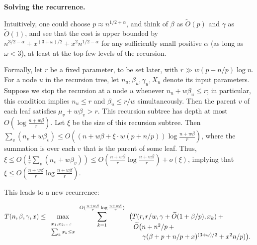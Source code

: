 \documentclass[10pt,a4paper]{article}
\begin{document}
\par
\par\medskip\noindent\textbf{Solving the recurrence.}\par
Intuitively, one could choose $p\approx n^{1/2+\alpha}$, and think of $\beta$ as $\widetilde{O}(p)$ and $\gamma$ as $\widetilde{O}(1)$, and see that the cost is upper bounded by $n^{3/2-\alpha}+x^{(3+\omega)/2}+x^{2}n^{1/2-\alpha}$ for any sufficiently small positive $\alpha$ (as long as $\omega<3$), at least at the top few levels of the recursion.
\par
\par
Formally, let $r$ be a fixed parameter, to be set later, with $r\gg w(p+n/p)\log n$. For a node $u$ in the recursion tree, let $n_{u},\beta_{u},\gamma_{u},X_{u}$ denote its input parameters. Suppose we stop the recursion at a node $u$ whenever $n_{u}+w\beta_{u}\leq r$; in particular, this condition implies $n_{u}\leq r$ and $\beta_{u}\leq r/w$ simultaneously. Then the parent $v$ of each leaf satisfies $\mu_{v}+w\beta_{v}>r$. This recursion subtree has depth at most $O(\log\frac{n+w\beta}{r})$. Let $\xi$ be the size of this recursion subtree. Then $\sum_{v}(n_{v}+w\beta_{v})\leq O((n+w\beta+\xi\cdot w(p+n/p))\log\frac{n+w%
\beta}{r})$, where the summation is over each $v$ that is the parent of some leaf. Thus, $\xi\leq O(\frac{1}{r}\sum_{v}(n_{v}+w\beta_{v}))\leq O(\frac{n+w\beta}{r}\log%
\frac{n+w\beta}{r})+o(\xi)$, implying that $\xi\leq O(\frac{n+w\beta}{r}\log\frac{n+w\beta}{r})$.
\par
\par
This leads to a new recurrence:
\par
\[\begin{aligned}
T(n,\beta,\gamma,x)\leq\max_{\begin{array}[]{l}\scriptstyle{x_{1},x_{2},\ldots%
:}\\
\scriptstyle{\sum_{k}x_{k}\leq x}\end{array}}\sum_{k=1}^{O(\frac{n+w\beta}{r}%
\log\frac{n+w\beta}{r})}\begin{array}[t]{l}\big(T(r,r/w,\gamma+\widetilde{O}(1%
+\beta/p),x_{k})+{}\\[2.15277pt]
\ \ \widetilde{O}\big(n+n^{2}/p+{}\\[2.15277pt]
\ \ \ \ \ \ \gamma(\beta+p+n/p+x)^{(3+\omega)/2}+x^{2}n/p)\big).\end{array}
\end{aligned}\]
\end{document}

